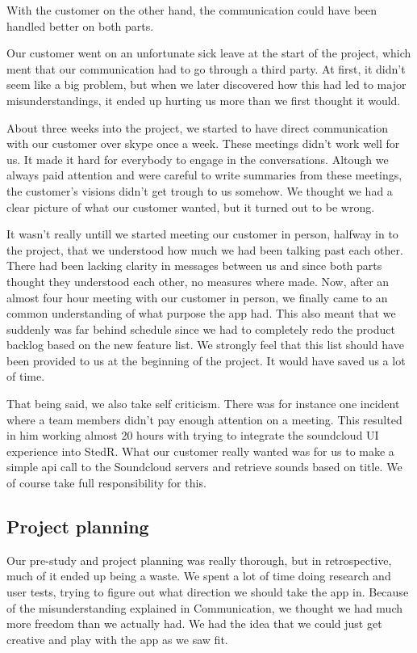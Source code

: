 With the customer on the other hand, the communication could have been handled better on both parts. 

Our customer went on an unfortunate sick leave at the start of the project, which ment that our communication had to go through a third party. At first, it didn't seem like a big problem, but when we later discovered how this had led to major misunderstandings, it ended up hurting us more than we first thought it would.

About three weeks into the project, we started to have direct communication with our customer over skype once a week. These meetings didn't work well for us. It made it hard for everybody to engage in the conversations. Altough we always paid attention and were careful to write summaries from these meetings, the customer's visions didn't get trough to us somehow. We thought we had a clear picture of what our customer wanted, but it turned out to be wrong.

It wasn't really untill we started meeting our customer in person, halfway in to the project, that we understood how much we had been talking past each other. There had been lacking clarity in messages between us and since both parts thought they understood each other, no measures where made. Now, after an almost four hour meeting with our customer in person, we finally came to an common understanding of what purpose the app had. This also meant that we suddenly was far behind schedule since we had to completely redo the product backlog based on the new feature list. We strongly feel that this list should have been provided to us at the beginning of the project. It would have saved us a lot of time.

That being said, we also take self criticism. There was for instance one incident where a team members didn't pay enough attention on a meeting. This resulted in him working almost 20 hours with trying to integrate the soundcloud UI experience into StedR. What our customer really wanted was for us to make a simple api call to the Soundcloud servers and retrieve sounds based on title. We of course take full responsibility for this. 


	\subsection{Project planning}


Our pre-study and project planning was really thorough, but in retrospective, much of it ended up being a waste. We spent a lot of time doing research and user tests, trying to figure out what direction we should take the app in. Because of the misunderstanding explained in Communication, we thought we had much more freedom than we actually had. We had the idea that we could just get creative and play with the app as we saw fit.

